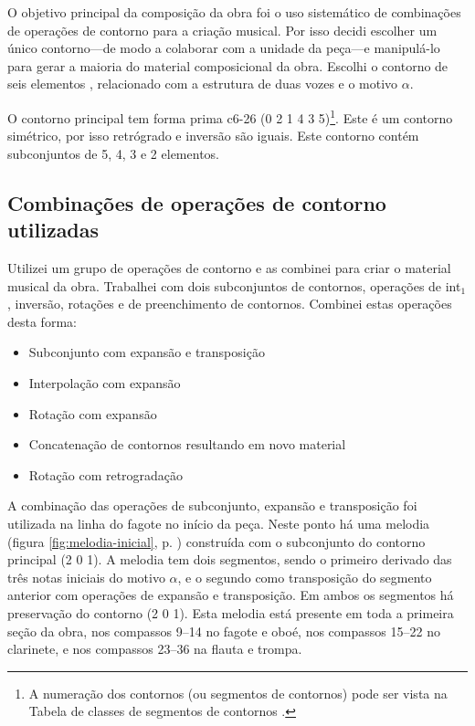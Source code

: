 O objetivo principal da composição da obra \obra{} foi o uso
sistemático de combinações de operações de contorno para a criação
musical. Por isso decidi escolher um único contorno---de modo a
colaborar com a unidade da peça---e manipulá-lo para gerar a maioria
do material composicional da obra. Escolhi o contorno de seis
elementos \contpr{}, relacionado com a estrutura de duas vozes e o
motivo $\alpha$.

O contorno principal \contpr{} tem forma prima c6-26 (0 2 1 4 3
5)\footnote{A numeração dos contornos (ou segmentos de contornos) pode
  ser vista na Tabela de classes de segmentos de contornos
  \cite{marvin.ea87:relating}.}. Este é um contorno simétrico, por
isso retrógrado e inversão são iguais. Este contorno contém
subconjuntos de 5, 4, 3 e 2 elementos.

\subsection{Combinações de operações de contorno utilizadas}
\label{sec:comb-de-oper}

Utilizei um grupo de operações de contorno e as combinei para criar o
material musical da obra. Trabalhei com dois subconjuntos de
contornos, operações de int$_1$, inversão, rotações e de preenchimento
de contornos. Combinei estas operações desta forma:

\begin{itemize}
\item Subconjunto com expansão e transposição
\item Interpolação com expansão
\item Rotação com expansão
\item Concatenação de contornos resultando em novo material
\item Rotação com retrogradação
\end{itemize}




A combinação das operações de subconjunto, expansão e transposição foi
utilizada na linha do fagote no início da peça. Neste ponto há uma
melodia (figura \ref{fig:melodia-inicial},
p. \pageref{fig:melodia-inicial}) construída com o subconjunto do
contorno principal (2 0 1). A melodia tem dois segmentos, sendo o
primeiro derivado das três notas iniciais do motivo $\alpha$, e o
segundo como transposição do segmento anterior com operações de
expansão e transposição. Em ambos os segmentos há preservação do
contorno (2 0 1). Esta melodia está presente em toda a primeira seção
da obra, nos compassos 9--14 no fagote e oboé, nos compassos 15--22 no
clarinete, e nos compassos 23--36 na flauta e trompa.

